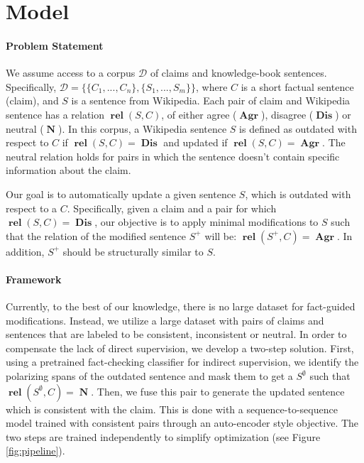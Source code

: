 \documentclass[letterpaper]{article}
\newcommand{\figref}[1]{Figure \ref{#1}}
\DeclareMathOperator{\rel}{\boldsymbol{rel}}
\DeclareMathOperator{\A}{\boldsymbol{Agr}}
\DeclareMathOperator{\D}{\boldsymbol{Dis}}
\DeclareMathOperator{\N}{\boldsymbol{N}}
\begin{document}
\section{Model}
\paragraph{Problem Statement}
\label{sec:prob_state}

We assume access to a corpus $\mathcal{D}$ of claims and knowledge-book sentences. Specifically, $\mathcal{D} = \{\{C_1 ,..., C_n\}, \{S_1, ..., S_m\}\}$, where $C$ is a short factual sentence (claim), and $S$ is a sentence from Wikipedia. Each pair of claim and Wikipedia sentence has a relation $\rel(S, C)$, of either agree ($\A$), disagree ($\D$) or neutral ($\N$). In this corpus, a Wikipedia sentence $S$ is defined as outdated with respect to $C$ if $\rel(S,C)=\D$ and updated if $\rel(S,C)=\A$. The neutral relation holds for pairs in which the sentence doesn't contain specific information about the claim.


Our goal is to automatically update a given sentence $S$, which is outdated with respect to a $C$. Specifically, given a claim and a pair for which $\rel(S, C) = \D$, our objective is to apply minimal modifications to $S$ such that the relation of the modified sentence $S^+$ will be: $\rel(S^+, C) = \A$. In addition, $S^+$ should be structurally similar to $S$.



\paragraph{Framework}



Currently, to the best of our knowledge, there is no large dataset for fact-guided modifications. Instead, we utilize a large dataset with pairs of claims and sentences that are labeled to be consistent, inconsistent or neutral.
In order to compensate the lack of direct supervision, we develop a two-step solution. First, using a pretrained fact-checking classifier for indirect supervision, we identify the polarizing spans of the outdated sentence and mask them to get a $S^{\emptyset}$ such that $\rel(S^{\emptyset},C) = \N$. Then, we fuse this pair to generate the updated sentence which is consistent with the claim. This is done with a sequence-to-sequence model trained with consistent pairs through an auto-encoder style objective. The two steps are trained independently to simplify optimization (see \figref{fig:pipeline}).
\end{document}
